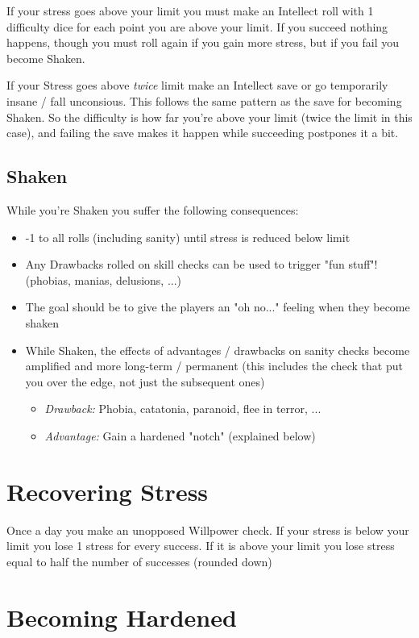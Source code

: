 If your stress goes above your limit you must make an Intellect roll with 1 difficulty dice for each point you are above your limit.
If you succeed nothing happens, though you must roll again if you gain more stress,
but if you fail you become Shaken.

If your Stress goes above \textit{twice} limit make an Intellect save or go temporarily insane / fall unconsious.
This follows the same pattern as the save for becoming Shaken. So the difficulty is how far you're above your limit (twice the limit in this case), and failing the save makes it happen while succeeding postpones it a bit.


\subsection{Shaken}
While you're Shaken you suffer the following consequences:
\begin{itemize}
    \item -1 to all rolls (including sanity) until stress is reduced below limit
    \item Any Drawbacks rolled on skill checks can be used to trigger "fun stuff"! (phobias, manias, delusions, ...)
    \item The goal should be to give the players an "oh no..." feeling when they become shaken
    \item While Shaken, the effects of advantages / drawbacks on sanity checks become amplified and more long-term / permanent (this includes the check that put you over the edge, not just the subsequent ones)
    \begin{itemize}
        \item \textit{Drawback:} Phobia, catatonia, paranoid, flee in terror, ...
        \item \textit{Advantage:} Gain a hardened "notch" (explained below)
    \end{itemize}
\end{itemize}

\section{Recovering Stress}
Once a day you make an unopposed Willpower check. If your stress is below your limit you lose 1 stress for every success. If it is above your limit you lose stress equal to half the number of successes (rounded down) 


\section{Becoming Hardened}

